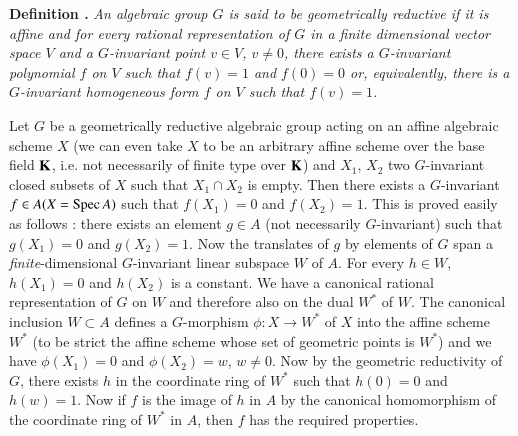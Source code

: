 \medskip
\noindent
{\bf Definition .\label{art18-defi3}}
{\em An algebraic group $G$ is said to be geometrically reductive if it is affine and for every rational representation of $G$ in a finite dimensional vector space $V$ and a $G$-invariant point $v\in V$, $v\neq 0$, there exists a $G$-invariant polynomial $f$ on $V$ such that $f(v)=1$ and $f(0)=0$ or, equivalently, there is a $G$-invariant homogeneous form $f$ on $V$ such that $f(v)=1$.}
\smallskip

Let $G$ be a geometrically reductive algebraic group acting on an affine algebraic scheme $X$ (we can even take $X$ to be an arbitrary affine scheme over the base field $\mathbf{K}$, i.e. not necessarily of finite type over $\mathbf{K}$) and $X_{1}$, $X_{2}$ two $G$-invariant closed subsets of $X$ such that $X_{1}\cap X_{2}$ is empty. Then there exists a $G$-invariant $f\in A(X=\operatorname{Spec} A)$ such that $f(X_{1})=0$ and $f(X_{2})=1$. This is proved easily as follows : there exists an element $g\in A$ (not necessarily $G$-invariant) such that $g(X_{1})=0$ and $g(X_{2})=1$. Now the translates of $g$ by elements of $G$ span a {\em finite}-dimensional $G$-invariant linear subspace $W$ of $A$. For every $h\in W$, $h(X_{1})=0$ and $h(X_{2})$ is a constant. We have a canonical rational representation of $G$ on $W$ and therefore also on the dual $W^{*}$ of $W$. The canonical inclusion $W\subset A$ defines a $G$-morphism $\phi:X\to W^{*}$ of $X$ into the affine scheme $W^{*}$ (to be strict the affine scheme whose set of geometric points is $W^{*}$) and we have $\phi (X_{1})=0$ and $\phi(X_{2})=w$, $w\neq 0$. Now by the geometric reductivity of $G$, there exists $h$ in the coordinate ring of $W^{*}$ such that $h(0)=0$ and $h(w)=1$. Now if $f$ is the image of $h$ in $A$ by the canonical homomorphism of the coordinate ring of $W^{*}$ in $A$, then $f$ has the required properties.

